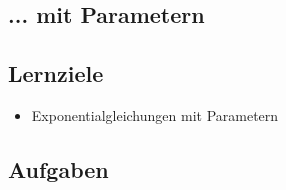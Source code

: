 

\subsection{... mit Parametern}

\subsection*{Lernziele}

\begin{itemize}
\item Exponentialgleichungen mit Parametern
\end{itemize}



\subsection*{Aufgaben}


